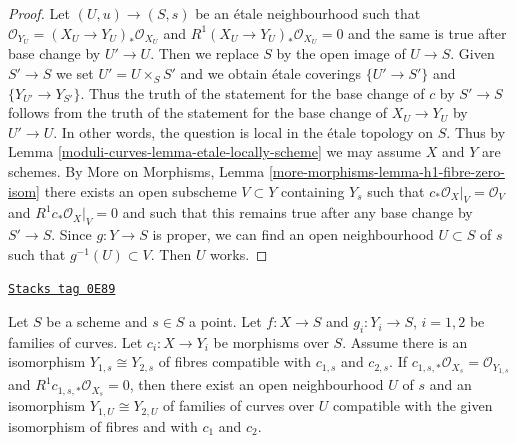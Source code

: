 \begin{proof}
Let $(U, u) \to (S, s)$ be an \'etale neighbourhood such that
$\mathcal{O}_{Y_U} = (X_U \to Y_U)_*\mathcal{O}_{X_U}$ and
$R^1(X_U \to Y_U)_*\mathcal{O}_{X_U} = 0$ and the same is true
after base change by $U' \to U$. Then we replace $S$ by the
open image of $U \to S$. Given $S' \to S$ we set $U' = U \times_S S'$
and we obtain \'etale coverings $\{U' \to S'\}$ and
$\{Y_{U'} \to Y_{S'}\}$. Thus the truth of the statement for
the base change of $c$ by $S' \to S$ follows from the truth
of the statement for the base change of $X_U \to Y_U$ by
$U' \to U$. In other words, the question is local in the
\'etale topology on $S$.
Thus by Lemma \ref{moduli-curves-lemma-etale-locally-scheme} we may assume
$X$ and $Y$ are schemes. By
More on Morphisms, Lemma \ref{more-morphisms-lemma-h1-fibre-zero-isom}
there exists an open subscheme $V \subset Y$ containing $Y_s$
such that $c_*\mathcal{O}_X|_V = \mathcal{O}_V$ and
$R^1c_*\mathcal{O}_X|_V = 0$ and such that this remains true after
any base change by $S' \to S$. Since $g : Y \to S$ is proper, we can
find an open neighbourhood $U \subset S$ of $s$ such that
$g^{-1}(U) \subset V$. Then $U$ works.
\end{proof}

\begin{lemma}
\label{moduli-curves-lemma-contract-basic-uniqueness}
\href{https://stacks.math.columbia.edu/tag/0E89}{\texttt{Stacks tag 0E89}}

Let $S$ be a scheme and $s \in S$ a point.
Let $f : X \to S$ and $g_i : Y_i \to S$, $i = 1, 2$ be families of curves.
Let $c_i : X \to Y_i$ be morphisms over $S$.
Assume there is an isomorphism $Y_{1, s} \cong Y_{2, s}$
of fibres compatible with $c_{1, s}$ and $c_{2, s}$.
If $c_{1, s, *}\mathcal{O}_{X_s} = \mathcal{O}_{Y_{1, s}}$ and
$R^1c_{1, s, *}\mathcal{O}_{X_s} = 0$, then there exist an
open neighbourhood $U$ of $s$ and an isomorphism
$Y_{1, U} \cong Y_{2, U}$ of families of curves over $U$
compatible with the given isomorphism of fibres and with
$c_1$ and $c_2$.
\end{lemma}

